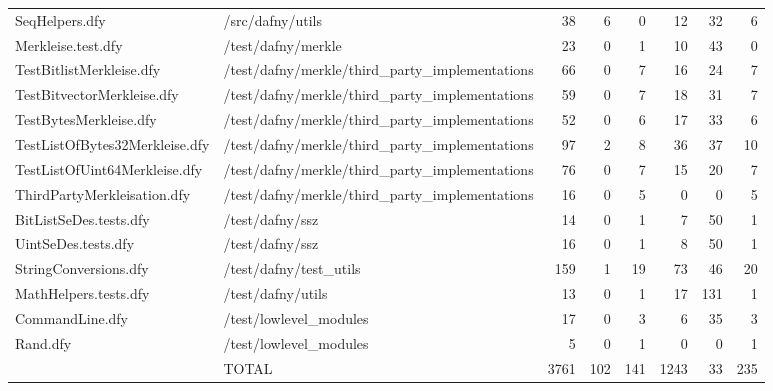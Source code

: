 \documentclass[a4paper, 12pt]{article}
\begin{document}
\begin{tabular}{llrrrrrr}
                 SeqHelpers.dfy &                                /src/dafny/utils &    38 &         6 &                0 &             12 &             32 &       6 \\
             Merkleise.test.dfy &                              /test/dafny/merkle &    23 &         0 &                1 &             10 &             43 &       0 \\
       TestBitlistMerkleise.dfy &  /test/dafny/merkle/third\_party\_implementations &    66 &         0 &                7 &             16 &             24 &       7 \\
     TestBitvectorMerkleise.dfy &  /test/dafny/merkle/third\_party\_implementations &    59 &         0 &                7 &             18 &             31 &       7 \\
         TestBytesMerkleise.dfy &  /test/dafny/merkle/third\_party\_implementations &    52 &         0 &                6 &             17 &             33 &       6 \\
 TestListOfBytes32Merkleise.dfy &  /test/dafny/merkle/third\_party\_implementations &    97 &         2 &                8 &             36 &             37 &      10 \\
  TestListOfUint64Merkleise.dfy &  /test/dafny/merkle/third\_party\_implementations &    76 &         0 &                7 &             15 &             20 &       7 \\
    ThirdPartyMerkleisation.dfy &  /test/dafny/merkle/third\_party\_implementations &    16 &         0 &                5 &              0 &              0 &       5 \\
         BitListSeDes.tests.dfy &                                 /test/dafny/ssz &    14 &         0 &                1 &              7 &             50 &       1 \\
            UintSeDes.tests.dfy &                                 /test/dafny/ssz &    16 &         0 &                1 &              8 &             50 &       1 \\
          StringConversions.dfy &                          /test/dafny/test\_utils &   159 &         1 &               19 &             73 &             46 &      20 \\
          MathHelpers.tests.dfy &                               /test/dafny/utils &    13 &         0 &                1 &             17 &            131 &       1 \\
                CommandLine.dfy &                          /test/lowlevel\_modules &    17 &         0 &                3 &              6 &             35 &       3 \\
                       Rand.dfy &                          /test/lowlevel\_modules &     5 &         0 &                1 &              0 &              0 &       1 \\
                                &                                           TOTAL &  3761 &       102 &              141 &           1243 &             33 &     235 \\
\bottomrule
\end{tabular}
\end{document}
